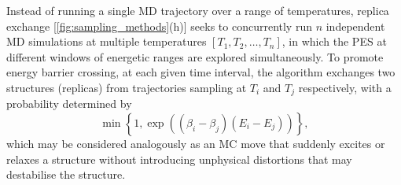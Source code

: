 
Instead of running a single MD trajectory over a range of temperatures, replica exchange [\cref{fig:sampling_methods}(h)] seeks to concurrently run $n$ independent MD simulations at multiple temperatures $[T_1,T_2,\ldots,T_n]$, in which the PES at different windows of energetic ranges are explored simultaneously. To promote energy barrier crossing, at each given time interval, the algorithm exchanges two structures (replicas) from trajectories sampling at $T_i$ and $T_j$ respectively, with a probability determined by
\begin{equation}
    \label{eq:replica_exchange}
    \min\left\{1, \exp\left((\beta_i-\beta_j)(E_i-E_j)\right)\right\},
\end{equation}
which may be considered  analogously as an MC move that suddenly excites or relaxes a structure without introducing unphysical distortions that may destabilise the structure. 
